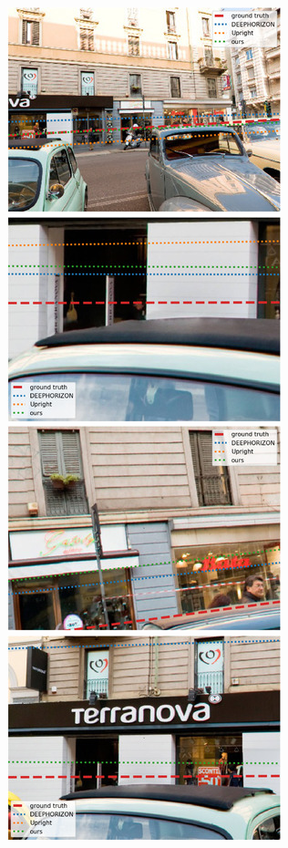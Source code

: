\includegraphics{horizon_estimation/thumb/pano_addiwhphxpexcd-0.jpg}
\includegraphics{horizon_estimation/thumb/pano_addiwhphxpexcd-1.jpg}
\includegraphics{horizon_estimation/thumb/pano_addiwhphxpexcd-2.jpg}
\includegraphics{horizon_estimation/thumb/pano_addiwhphxpexcd-3.jpg}
